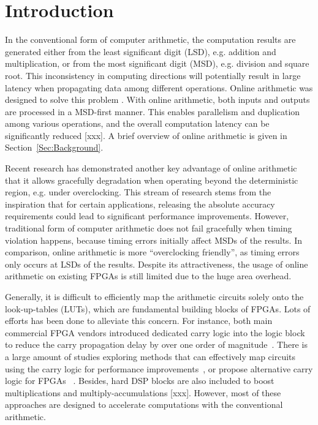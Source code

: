 \documentclass[conference]{IEEEtran}
\begin{document}
%



\section{Introduction}\label{Sec:Intro}
In the conventional form of computer arithmetic, the computation results are generated either from the least significant digit (LSD), e.g. addition and multiplication, or from the most significant digit (MSD), e.g. division and square root. This inconsistency in computing directions will potentially result in large latency when propagating data among different operations. Online arithmetic was designed to solve this problem \cite{Ercegovac_OnlineOverview,Ercegovac_Book}. With online arithmetic, both inputs and outputs are processed in a MSD-first manner. This enables parallelism and duplication among various operations, and the overall computation latency can be significantly reduced [xxx]. A brief overview of online arithmetic is given in Section~\ref{Sec:Background}.

Recent research has demonstrated another key advantage of online arithmetic that it allows gracefully degradation when operating beyond the deterministic region, e.g. under overclocking. This stream of research stems from the inspiration that for certain applications, releasing the absolute accuracy requirements could lead to significant performance improvements. However, traditional form of computer arithmetic does not fail gracefully when timing violation happens, because timing errors initially affect MSDs of the results. In comparison, online arithmetic is more ``overclocking friendly'', as timing errors only occurs at LSDs of the results. Despite its attractiveness, the usage of online arithmetic on existing FPGAs is still limited due to the huge area overhead.

Generally, it is difficult to efficiently map the arithmetic circuits solely onto the look-up-tables (LUTs), which are fundamental building blocks of FPGAs. Lots of efforts has been done to alleviate this concern. For instance, both main commercial FPGA vendors introduced dedicated carry logic into the logic block to reduce the carry propagation delay by over one order of magnitude~\cite{Virtex6}. There is a large amount of studies exploring methods that can effectively map circuits using the carry logic for performance improvements~\cite{FPL10_FPGA_CarryChain,Prefix_CarryChain}, or propose alternative carry logic for FPGAs~\cite{FPGA_CarryChain_New1,FPGA_CarryChain_New2} . Besides, hard DSP blocks are also included to boost multiplications and multiply-accumulations [xxx]. However, most of these approaches are designed to accelerate computations with the conventional arithmetic.
\end{document}
